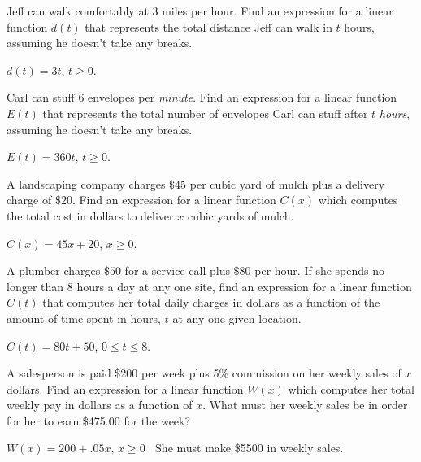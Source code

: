 \documentclass{ximera}
\begin{document}
\begin{problem}
Jeff can walk comfortably at $3$ miles per hour.  Find an expression for a linear function $d(t)$ that represents the total distance Jeff can walk in $t$ hours, assuming he doesn't take any breaks.   

\begin{solution}
$d(t) = 3t$, $t \geq 0$.
\end{solution}
\end{problem}

\begin{problem}
Carl can stuff $6$ envelopes per \textit{minute}.  Find an expression for a linear function $E(t)$ that represents the total number of envelopes Carl can stuff after $t$ \textit{hours}, assuming he doesn't take any breaks.

\begin{solution}
$E(t) = 360t$, $t \geq 0$.
\end{solution}
\end{problem}

\begin{problem}
A landscaping company charges $\$45$ per cubic yard of mulch plus a delivery charge of $\$20$.  Find an expression for a  linear function $C(x)$ which computes the total cost in dollars  to deliver $x$ cubic yards of mulch.

\begin{solution}
$C(x) = 45x+20$, $x \geq 0$.
\end{solution}
\end{problem}

\begin{problem}
A plumber charges $\$50$ for a service call plus $\$80$ per hour.  If she spends no longer than 8 hours a day at any one site, find an expression for a  linear function $C(t)$ that computes her total daily charges in dollars as a function of the amount of time spent in hours, $t$  at any one given location.

\begin{solution}
$C(t) = 80t + 50$,  $0 \leq t \leq 8$.
\end{solution}
\end{problem}

\begin{problem}
A salesperson is paid \$200 per week plus 5\% commission on her weekly sales of $x$ dollars.  Find an expression for a  linear function $W(x)$ which computes her total weekly pay in dollars as a function of $x$.  What must her weekly sales be in order for her to earn \$475.00 for the week?

\begin{solution}
$W(x) = 200 + .05x,\, x \geq 0\;\;$ She must make \$5500 in weekly sales.
\end{solution}
\end{problem}
\end{document}
